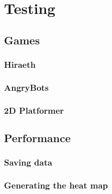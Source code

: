 \section{Testing}
\label{Testing}



\subsection{Games}
\label{Testing_Games}



\subsubsection{Hiraeth}
\label{Testing_Games_Hiraeth}



\subsubsection{AngryBots}
\label{Testing_Games_AB}



\subsubsection{2D Platformer}
\label{Testing_Games_2D}



\subsection{Performance}
\label{Testing_Performance}


\subsubsection{Saving data}
\label{Testing_Performance_Saving}



\subsubsection{Generating the heat map}
\label{Testing_Performance_Generating}

